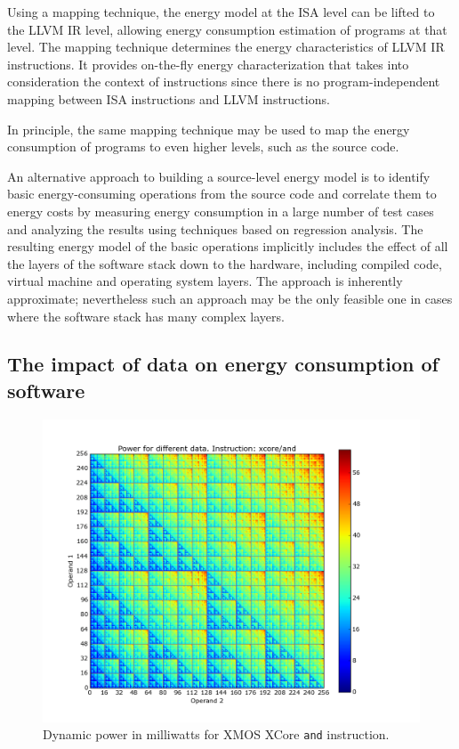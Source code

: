 Using a mapping technique, 
the energy model at the ISA level can be lifted to the LLVM IR level, allowing energy
consumption estimation of programs at that level. 
The mapping technique determines the energy characteristics of LLVM IR
instructions. It provides on-the-fly energy characterization that takes into
consideration the context of instructions since there is no program-independent mapping between
ISA instructions and LLVM instructions.

In principle, the same mapping technique may be used to map the energy consumption
of programs to even higher levels, such as the source code. 


An alternative approach to building a source-level energy model is to identify
basic energy-consuming operations from the source code and
correlate them to energy costs by measuring energy consumption in
a large number of test cases and analyzing the results using techniques
based on regression analysis. The resulting energy model of the basic
operations implicitly includes the effect of all the layers of the software
stack down to the hardware, including compiled code, virtual machine and operating
system layers. The approach is inherently approximate;
nevertheless such an approach may be the only feasible one in cases where the software
stack has many complex layers. 


\subsection{The impact of data on energy consumption of software}

\begin{figure}
    \centering
    \includegraphics[width = 0.85\linewidth]{and_map}
    \caption{Dynamic power in milliwatts for XMOS XCore {\tt and} instruction.}
    \label{f:and-heatmap}
\end{figure}



